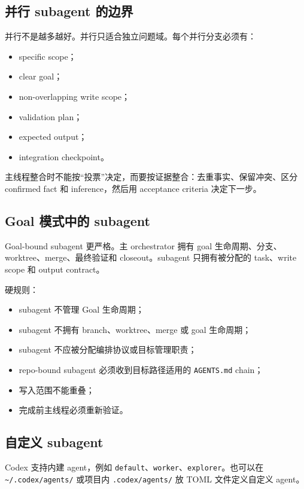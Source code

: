 \documentclass[UTF8,a4paper,11pt,fontset=none]{ctexart}
\newcommand{\skill}[1]{\texttt{#1}}
\newcommand{\file}[1]{\texttt{#1}}
\begin{document}
\subsection{并行 subagent 的边界}

并行不是越多越好。并行只适合独立问题域。每个并行分支必须有：

\begin{itemize}
  \item specific scope；
  \item clear goal；
  \item non-overlapping write scope；
  \item validation plan；
  \item expected output；
  \item integration checkpoint。
\end{itemize}

主线程整合时不能按“投票”决定，而要按证据整合：去重事实、保留冲突、区分 confirmed fact 和 inference，然后用 acceptance criteria 决定下一步。

\subsection{Goal 模式中的 subagent}

Goal-bound subagent 更严格。主 orchestrator 拥有 goal 生命周期、分支、worktree、merge、最终验证和 closeout。subagent 只拥有被分配的 task、write scope 和 output contract。

硬规则：

\begin{itemize}
  \item subagent 不管理 Goal 生命周期；
  \item subagent 不拥有 branch、worktree、merge 或 goal 生命周期；
  \item subagent 不应被分配编排协议或目标管理职责；
  \item repo-bound subagent 必须收到目标路径适用的 \file{AGENTS.md} chain；
  \item 写入范围不能重叠；
  \item 完成前主线程必须重新验证。
\end{itemize}

\subsection{自定义 subagent}

Codex 支持内建 agent，例如 \skill{default}、\skill{worker}、\skill{explorer}。也可以在 \file{\textasciitilde/.codex/agents/} 或项目内 \file{.codex/agents/} 放 TOML 文件定义自定义 agent。
\end{document}
